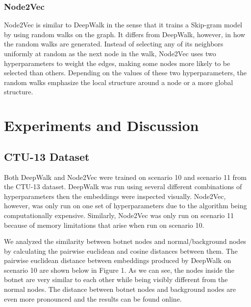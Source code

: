 \documentclass[10pt]{article}
\begin{document}
\begin{multicols}{2}
\subsubsection{Node2Vec}
Node2Vec \cite{Grover} is similar to DeepWalk in the sense that it trains a Skip-gram model by using random walks on the graph. It differs from DeepWalk, however, in how the random walks are generated. Instead of selecting any of its neighbors uniformly at random as the next node in the walk, Node2Vec uses two hyperparameters to weight the edges, making some nodes more likely to be selected than others. Depending on the values of these two hyperparameters, the random walks emphasize the local structure around a node or a more global structure. 

\section{Experiments and Discussion}
\subsection{CTU-13 Dataset}

Both DeepWalk and Node2Vec were trained on scenario 10 and scenario 11 from the CTU-13 dataset. DeepWalk was run using several different combinations of hyperparameters then the embeddings were inspected visually. Node2Vec, however, was only run on one set of hyperparameters due to the algorithm being computationally expensive. Similarly, Node2Vec was only run on scenario 11 because of memory limitations  that arise when run on scenario 10.

We analyzed the similarity between botnet nodes and normal/background nodes by calculating the pairwise euclidean and cosine distances between them. The pairwise euclidean distance between embeddings produced by DeepWalk on scenario 10  are shown below in Figure 1. As we can see, the nodes inside the botnet are very similar to each other while being visibly different from the normal nodes. The distance between botnet nodes and background nodes are even more pronounced and the results can be found online.



\end{multicols}
\end{document}
